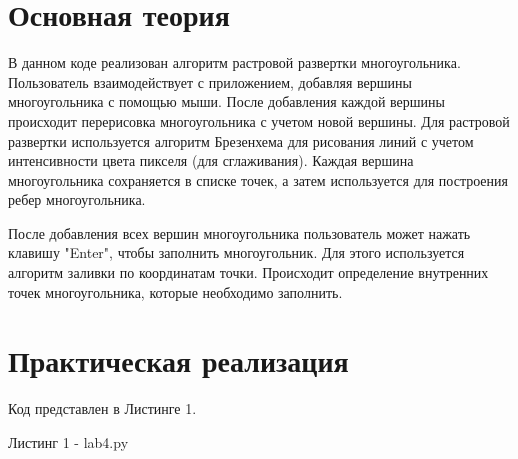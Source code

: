 \documentclass[a4paper, 14pt]{extarticle}
\begin{document}
\section{Основная теория}

\par
В данном коде реализован алгоритм растровой развертки многоугольника. Пользователь взаимодействует с приложением, добавляя вершины многоугольника с помощью мыши. После добавления каждой вершины происходит перерисовка многоугольника с учетом новой вершины. Для растровой развертки используется алгоритм Брезенхема для рисования линий с учетом интенсивности цвета пикселя (для сглаживания). Каждая вершина многоугольника сохраняется в списке точек, а затем используется для построения ребер многоугольника.
\par
После добавления всех вершин многоугольника пользователь может нажать клавишу "Enter", чтобы заполнить многоугольник. Для этого используется алгоритм заливки по координатам точки. Происходит определение внутренних точек многоугольника, которые необходимо заполнить.

\pagebreak
\section{Практическая реализация}
Код представлен в Листинге 1.
\par
\begin{center}
    Листинг 1 - lab4.py
\end{center}
\end{document}
